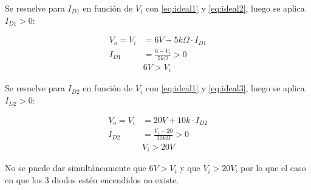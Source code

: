 Se resuelve para $I_{D1}$ en función de $V_i$ con \ref{eq:ideal1} y
\ref{eq:ideal2}, luego se aplica $I_{D1} > 0$:

\begin{align*}
  V_o = V_i &= 6V - 5k\Omega \cdot I_{D1} \\
  I_{D1} &= \frac{6 - V_i}{5k\Omega} > 0 \\
  & 6V > V_i
\end{align*}

Se resuelve para $I_{D2}$ en función de $V_i$ con \ref{eq:ideal1} y
\ref{eq:ideal3}, luego se aplica $I_{D2} > 0$:

\begin{align*}
  V_o = V_i &= 20V + 10k \cdot I_{D2} \\
  I_{D2} &= \frac{V_i - 20}{10k\Omega} > 0 \\
  & V_i > 20V
\end{align*}

No se puede dar simultáneamente que $6V > V_i$ y que  $V_i > 20V$, por lo que el
caso en que los 3 diodos estén encendidos no existe.
